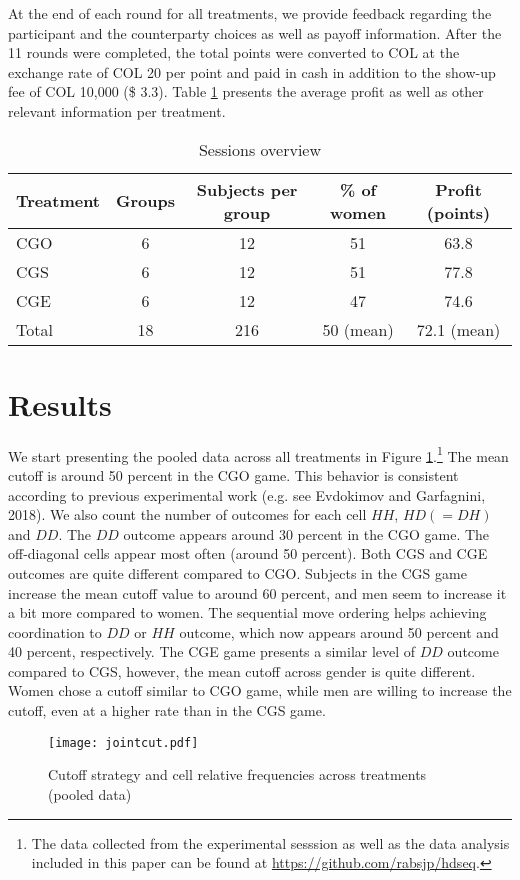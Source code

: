 \documentclass[12pt,english]{article}
\begin{document}
At the end of each round for all treatments, we provide feedback regarding the participant and the counterparty choices as well as payoff information. After the 11 rounds were completed, the total points were converted to COL at the exchange rate of COL 20 per point and paid in cash in addition to the show-up fee of COL 10,000 (\$ 3.3). Table \ref{session} presents the average profit as well as other relevant information per treatment. 

\begin{table}[ht]
\centering
\begin{tabular}{lcccc}
  Treatment & Groups & Subjects per group & \% of women & Profit (points)\\
  \hline
  CGO & 6 & 12 & 51 & 63.8 \\
  CGS & 6 & 12 & 51 & 77.8 \\
  CGE & 6 & 12 & 47 & 74.6 \\
\hline
Total & 18 & 216 &  50 (mean) & 72.1 (mean)\\
\end{tabular}
\caption{Sessions overview }
\label{session}
\end{table}


\section{Results}
\label{sec:results}

We start presenting the pooled data across all treatments in Figure \ref{fig:cutpooled}.\footnote{The data collected from the experimental sesssion as well as the data analysis included in this paper can be found at \url{https://github.com/rabsjp/hdseq}.} The mean cutoff is around 50 percent in the CGO game. This behavior is consistent according to previous experimental work (e.g. see Evdokimov and Garfagnini, 2018). We also count the number of outcomes for each cell $HH$, $HD (=DH)$ and $DD$. The $DD$ outcome appears around 30 percent in the CGO game. The off-diagonal cells appear most often (around 50 percent). Both CGS and CGE outcomes are quite different compared to CGO. Subjects in the CGS game increase the mean cutoff value to around 60 percent, and men seem to increase it a bit more compared to women. The sequential move ordering helps achieving coordination to $DD$ or $HH$ outcome, which now appears around 50 percent and 40 percent, respectively. The CGE game presents a similar level of $DD$ outcome compared to CGS, however, the mean cutoff across gender is quite different. Women chose a cutoff similar to CGO game, while men are willing to increase the cutoff, even at a higher rate than in the CGS game. 
\begin{center}
\begin{figure}[ht]
\centering{}%
\texttt{[image: jointcut.pdf]}%
\caption{Cutoff strategy and cell relative frequencies across treatments (pooled data)} 
\label{fig:cutpooled}
\end{figure}
\par\end{center}
\end{document}
